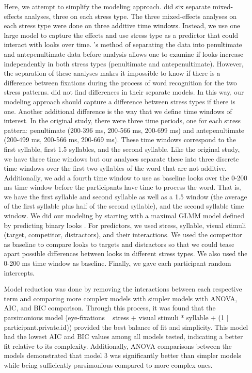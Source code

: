 Here, we attempt to simplify the modeling approach. \cite{Sulpizio_McQueen_2012} did six separate mixed-effects analyses, three on each stress type. The three mixed-effects analyses on each stress type were done on three additive time windows. Instead, we use one large model to capture the effects and use stress type as a predictor that could interact with looks over time. \cite{Sulpizio_McQueen_2012}'s method of separating the data into penultimate and antepenultimate data before analysis allows one to examine if looks increase independently in both stress types (penultimate and antepenultimate). However, the separation of these analyses makes it impossible to know if there is a difference between fixations during the process of word recognition for the two stress patterns. \cite{Sulpizio_McQueen_2012} did not find differences in their separate models. In this way, our modeling approach should capture a difference between stress types if there is one. Another additional difference is the way that we define time windows of interest. In the original study, there were three time periods, one for each stress pattern: penultimate (200-396 ms, 200-566 ms, 200-699 ms) and antepenultimate (200-499 ms, 200-566 ms, 200-669 ms). These time windows correspond to the first syllable, first 1.5 syllables, and the second syllable. Like the original study, we have three time windows but our analyses separate these into three discrete time windows over the first two syllables of the word that are not additive. Additionally, we add a fourth time window to use as baseline looks over the 0-200 ms time window before the participants have time to process the word. That is, we have the first syllable and second syllable as well as a 1.5 window (the average of the first syllable plus half of the second syllable), and the second syllable time window. We did our modeling by starting with a maximal GLMM model defined by predicting binary looks \citep{Barr_2008}. For predictors, we used stress, syllable, visual stimuli (target, competitor, distractors), and their interactions. We used the competitor as baseline to compare looks to targets and distractors so that we could tease apart possible differences between looks in different stress types. We also used the 0-200 ms time window as baseline. Finally, we gave each participant random intercepts.

Model reduction was done by removing the interactions between each respective term and comparing more complex models with simpler models with ANOVA, AIC, and BIC comparison. Through this process, it was found that the parsimonious model (eye-fixations ~ stress + visual stimuli * syllable + (1 | participant.private.id)) provided the best balance of fit and simplicity. This model had the lowest AIC and BIC values among all models tested, indicating a better fit relative to its complexity. Additionally, ANOVA comparisons between the models demonstrated that model 3 was significantly better than simpler models while being sufficiently parsimonious compared to more complex ones.

